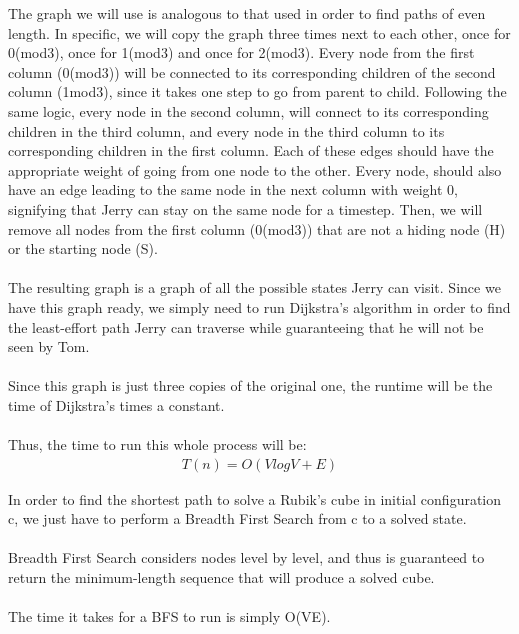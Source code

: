 \documentclass[12pt,twoside]{article}
\begin{document}
\begin{problems}
\begin{problemparts}
The graph we will use is analogous to that used in order to find paths of even length. In specific, we will copy the graph three times next to each other, once for 0(mod3), once for 1(mod3) and once for 2(mod3). Every node from the first column (0(mod3)) will be connected to its corresponding children of the second column (1mod3), since it takes one step to go from parent to child. Following the same logic, every node in the second column, will connect to its corresponding children in the third column, and every node in the third column to its corresponding children in the first column. Each of these edges should have the appropriate weight of going from one node to the other. Every node, should also have an edge leading to the same node in the next column with weight 0, signifying that Jerry can stay on the same node for a timestep. 
Then, we will remove all nodes from the first column (0(mod3)) that are not a hiding node (H) or the starting node (S).
\\\\
The resulting graph is a graph of all the possible states Jerry can visit. Since we have this graph ready, we simply need to run Dijkstra's algorithm in order to find the least-effort path Jerry can traverse while guaranteeing that he will not be seen by Tom.
\\\\
Since this graph is just three copies of the original one, the runtime will be the time of Dijkstra's times a constant.
\\\\
 Thus, the time to run this whole process will be: 
\begin{align*}
T(n)=O(VlogV+E)
\end{align*}


\end{problemparts}

\problem  %

\begin{problemparts}
\problempart
In order to find the shortest path to solve a Rubik's cube in initial configuration c, we just have to perform a Breadth First Search from c to a solved state.
\\\\
Breadth First Search considers nodes level by level, and thus is guaranteed to return the minimum-length sequence that will produce a solved cube.
\\\\
The time it takes for a BFS to run is simply O(VE).


\end{problemparts}
\end{problems}
\end{document}

